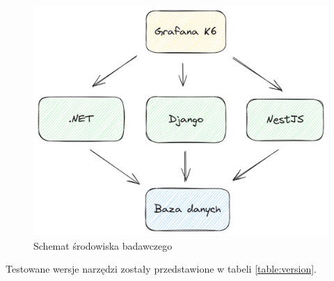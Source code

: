 \begin{figure}[!hb]
	\centering \includegraphics[width=1\linewidth]{rysunki/framework_benchmark_schema.png}
	\caption{Schemat środowiska badawczego}
	\label{rys:docker_schema}
\end{figure}



Testowane wersje narzędzi zostały przedstawione w tabeli \ref{table:version}.



